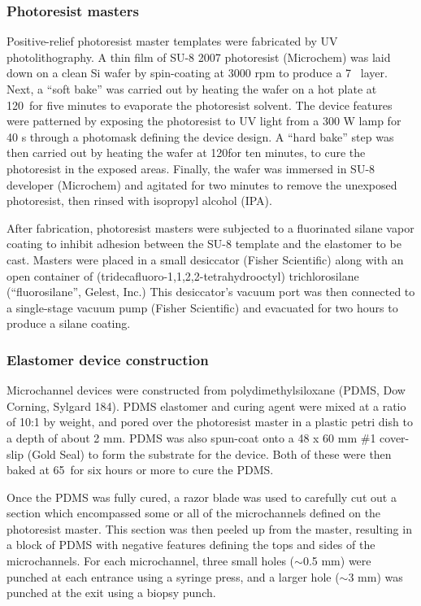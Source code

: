 \subsubsection{Photoresist masters}
Positive-relief photoresist master templates were fabricated by UV photolithography. A thin film
of SU-8 2007 photoresist (Microchem) was laid down on a clean Si wafer by spin-coating at 3000 rpm to produce a 
7 \microns~layer. Next, a ``soft bake'' was carried out by heating the wafer on a hot plate at 
120\degC~for five minutes to evaporate the photoresist solvent.  The device features were patterned by exposing the 
photoresist to UV light from a 300 W lamp for 40 s through a photomask defining the device design. A ``hard bake'' step
was then carried out by heating the wafer at 120\degC for ten minutes, to cure the photoresist in the exposed areas.
Finally, the wafer was immersed in SU-8 developer (Microchem) and agitated for two minutes to remove the unexposed
photoresist, then rinsed with isopropyl alcohol (IPA).

After fabrication, photoresist masters were subjected to a fluorinated silane vapor coating to inhibit adhesion
between the SU-8 template and the elastomer to be cast. Masters were placed in a small desiccator (Fisher Scientific)
along with an open container of (tridecafluoro-1,1,2,2-tetrahydrooctyl) trichlorosilane (``fluorosilane'', Gelest, Inc.)
This desiccator's vacuum port was then connected to a single-stage vacuum pump 
(Fisher Scientific) and evacuated for two hours to produce
a silane coating.

\subsubsection{Elastomer device construction}

Microchannel devices were constructed from polydimethylsiloxane (PDMS, Dow Corning, Sylgard 184). PDMS
elastomer and curing agent were mixed at a ratio of 10:1 by weight, and pored over the photoresist master 
in a plastic petri dish to a depth of about 2 mm.  PDMS was also spun-coat onto a 48 x 60 mm \#1 cover-slip (Gold Seal)
to form the substrate for the device.
Both of these  were then baked at 65\degC~for six hours or more to cure
the PDMS.  

Once the PDMS was fully cured, a razor blade was used to carefully cut out a section which encompassed some or all of
the microchannels defined on the photoresist master. This section was then peeled up from the master, resulting
in a block of PDMS with negative features defining the tops and sides of the microchannels.
For each microchannel, three small holes ($\sim$0.5 mm) were punched at each entrance using a syringe press, and a larger
hole ($\sim$3 mm) was punched at the exit using a biopsy punch.

